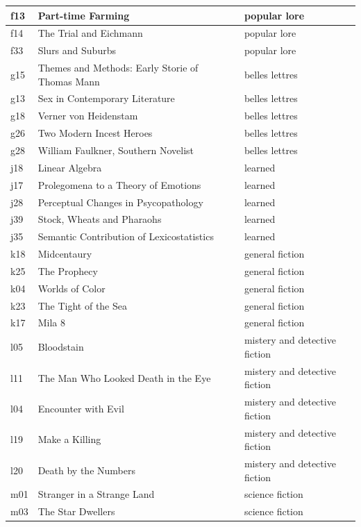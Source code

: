 \documentclass[12pt,letterpaper,twoside]{article}
\begin{document}
\begin{longtable}{| p{} | p{} | p{}|}
        f13 & Part-time Farming & popular lore  \\ \hline
        f14 & The Trial and Eichmann & popular lore  \\ \hline
        f33 & Slurs and Suburbs & popular lore  \\ \hline
        g15 & Themes and Methods: Early Storie of Thomas Mann & belles lettres  \\ \hline
        g13 & Sex in Contemporary Literature & belles lettres  \\ \hline
        g18 & Verner von Heidenstam & belles lettres  \\ \hline
        g26 & Two Modern Incest Heroes & belles lettres  \\ \hline
        g28 & William Faulkner, Southern Novelist & belles lettres \\ \hline
        j18 & Linear Algebra & learned  \\ \hline
        j17 & Prolegomena to a Theory of Emotions & learned  \\ \hline
        j28 & Perceptual Changes in Psycopathology & learned  \\ \hline
        j39 & Stock, Wheats and Pharaohs & learned \\ \hline
        j35 & Semantic Contribution of Lexicostatistics & learned  \\ \hline
        k18 & Midcentaury & general fiction  \\ \hline
        k25 & The Prophecy & general fiction  \\ \hline
        k04 & Worlds of Color & general fiction  \\ \hline
        k23 & The Tight of the Sea & general fiction  \\ \hline
        k17 & Mila 8 & general fiction  \\ \hline
        l05 & Bloodstain & mistery and detective fiction  \\ \hline
        l11 & The Man Who Looked Death in the Eye & mistery and detective fiction  \\ \hline
        l04 & Encounter with Evil & mistery and detective fiction  \\ \hline
        l19 & Make a Killing & mistery and detective fiction  \\ \hline
        l20 & Death by the Numbers & mistery and detective fiction  \\ \hline
        m01 & Stranger in a Strange Land & science fiction  \\ \hline
        m03 & The Star Dwellers & science fiction  \\ \hline

\end{longtable}
\end{document}
